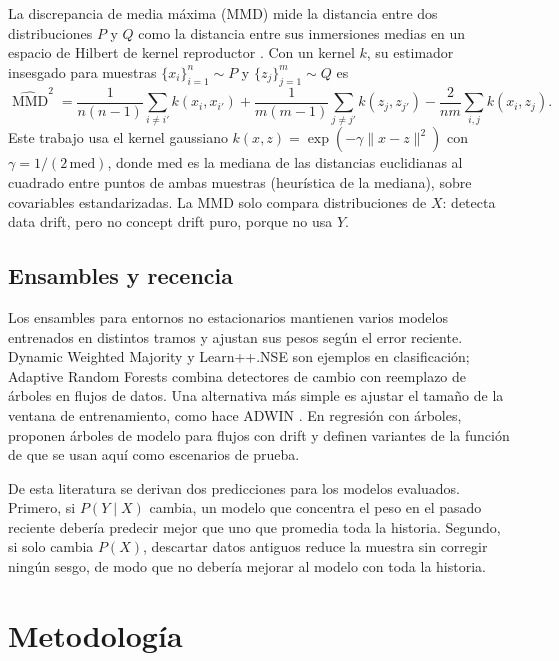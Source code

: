 \documentclass[11pt,a4paper]{article}
\newcommand{\MMD}{\operatorname{MMD}}
\begin{document}
La discrepancia de media máxima (MMD) mide la distancia entre dos distribuciones $P$ y $Q$ como la
distancia entre sus inmersiones medias en un espacio de Hilbert de kernel reproductor
\parencite{gretton2012}. Con un kernel $k$, su estimador insesgado para muestras
$\{x_i\}_{i=1}^n\sim P$ y $\{z_j\}_{j=1}^m\sim Q$ es
\begin{equation}\label{eq:mmd}
\widehat{\MMD}^2 = \frac{1}{n(n-1)}\sum_{i\neq i'} k(x_i,x_{i'})
+ \frac{1}{m(m-1)}\sum_{j\neq j'} k(z_j,z_{j'})
- \frac{2}{nm}\sum_{i,j} k(x_i,z_j).
\end{equation}
Este trabajo usa el kernel gaussiano $k(x,z)=\exp(-\gamma\lVert x-z\rVert^2)$ con
$\gamma = 1/(2\,\mathrm{med})$, donde $\mathrm{med}$ es la mediana de las distancias euclidianas al
cuadrado entre puntos de ambas muestras (heurística de la mediana), sobre covariables estandarizadas.
La MMD solo compara distribuciones de $X$: detecta data drift, pero no concept drift puro, porque no
usa $Y$.

\subsection{Ensambles y recencia}

Los ensambles para entornos no estacionarios mantienen varios modelos entrenados en distintos tramos
y ajustan sus pesos según el error reciente. Dynamic Weighted Majority \parencite{kolter2007} y
Learn++.NSE \parencite{elwell2011} son ejemplos en clasificación; Adaptive Random Forests
\parencite{gomes2017} combina detectores de cambio con reemplazo de árboles en flujos de datos. Una
alternativa más simple es ajustar el tamaño de la ventana de entrenamiento, como hace ADWIN
\parencite{bifet2007}. En regresión con árboles, \textcite{ikonomovska2011} proponen árboles de modelo
para flujos con drift y definen variantes de la función de \textcite{friedman1991} que se usan aquí
como escenarios de prueba.

De esta literatura se derivan dos predicciones para los modelos evaluados. Primero, si $P(Y\mid X)$
cambia, un modelo que concentra el peso en el pasado reciente debería predecir mejor que uno que
promedia toda la historia. Segundo, si solo cambia $P(X)$, descartar datos antiguos reduce la muestra
sin corregir ningún sesgo, de modo que no debería mejorar al modelo con toda la historia.

\section{Metodología}\label{sec:metodo}
\end{document}
